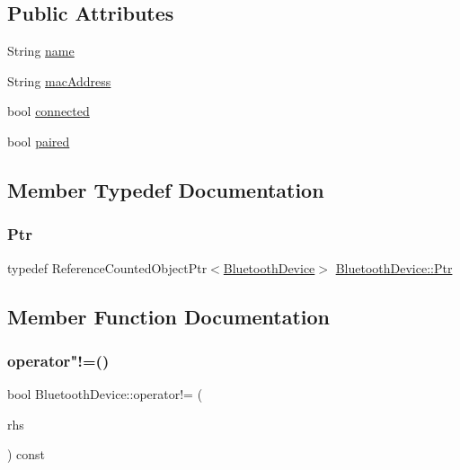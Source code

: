 \subsection*{Public Attributes}
\begin{DoxyCompactItemize}
\item 
String \mbox{\hyperlink{classBluetoothDevice_accb2b8cf46501c6482dfd682cd64c410}{name}}
\item 
String \mbox{\hyperlink{classBluetoothDevice_a7adf8bb341962e2add556087e242c28b}{mac\+Address}}
\item 
bool \mbox{\hyperlink{classBluetoothDevice_a360302ecf208a29599902a9c2ade7290}{connected}}
\item 
bool \mbox{\hyperlink{classBluetoothDevice_ab7b0da26a809343fbad8cb49f9ef692b}{paired}}
\end{DoxyCompactItemize}


\subsection{Member Typedef Documentation}
\mbox{\label{classBluetoothDevice_a09533a65feced122f347c2b676c4e74a}} 
\subsubsection{\texorpdfstring{Ptr}{Ptr}}
{\footnotesize\ttfamily typedef Reference\+Counted\+Object\+Ptr$<$\mbox{\hyperlink{classBluetoothDevice}{Bluetooth\+Device}}$>$ \mbox{\hyperlink{classBluetoothDevice_a09533a65feced122f347c2b676c4e74a}{Bluetooth\+Device\+::\+Ptr}}}



\subsection{Member Function Documentation}
\mbox{\label{classBluetoothDevice_a4e5b8d76461d72ebc4689d6b9abd1bd7}} 
\subsubsection{\texorpdfstring{operator"!=()}{operator!=()}}
{\footnotesize\ttfamily bool Bluetooth\+Device\+::operator!= (\begin{DoxyParamCaption}\item[{const \mbox{\hyperlink{classBluetoothDevice}{Bluetooth\+Device}}}]{rhs }\end{DoxyParamCaption}) const\hspace{0.3cm}{\ttfamily [inline]}}

